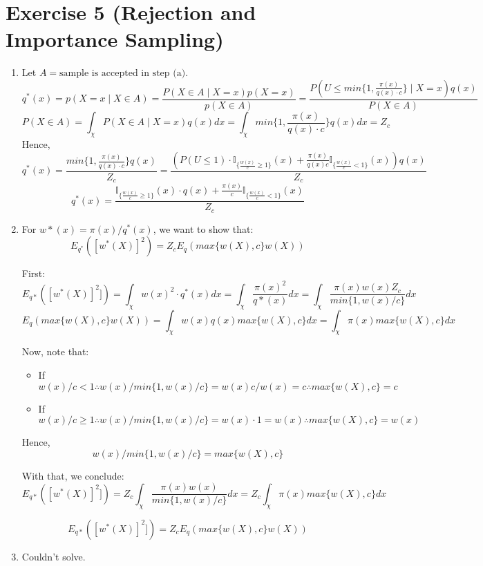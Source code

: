 \documentclass[12pt,letterpaper]{article}
\begin{document}
\section*{Exercise 5 (Rejection and Importance Sampling)}
\begin{enumerate}[leftmargin=!,labelindent=5pt]

	\item Let $A = \text{sample is accepted in step (a)}$.
	$$ q^*(x) = p(X=x \mid X \in A) =
	\frac{P(X \in A \mid X=x) p(X=x)}{p(X \in A)} = 
	\frac{P(U \leq min\{1,\frac{\pi(x)}{q(x)\cdot c}\}\mid X=x)
	q(x)}{P(X \in A)}
	$$
	$$ P(X \in A) = \int_\chi P(X \in A \mid X=x) q(x) dx =
	\int_\chi min\{1,\frac{\pi(x)}{q(x)\cdot c}\}q(x) dx = Z_c
	$$
	Hence,
	$$q^*(x) = \frac{ min\{1,\frac{\pi(x)}{q(x)\cdot c}\}q(x)}{Z_c}=
	\frac{
	\left(
	P(U \leq 1) \cdot \mathbb{I}_{\{ \frac{w(x)}{c}\geq 1\}}(x) + 
	\frac{\pi(x)}{q(x)c}
	\mathbb{I}_{\{ \frac{w(x)}{c} < 1\}}(x) \right)q(x)}{Z_c}
	$$
	$$ q^*(x) =
	\frac{
	\mathbb{I}_{\{ \frac{w(x)}{c}\geq 1\}}(x)\cdot q(x) + 
	\frac{\pi(x)}{c}
	\mathbb{I}_{\{ \frac{w(x)}{c} < 1\}}(x)}{Z_c}
	$$

	\item For $w*(x)=\pi(x)/q^*(x)$, we want to show that:
	$$ E_{q^*}([w^*(X)]^2) = Z_c E_q(max\{ w(X), c\}w(X))$$

	First:
	$$ E_{q*}([w^*(X)]^2]) = \int_\chi w(x)^2\cdot q^*(x) dx =
	\int_\chi \frac{\pi(x)^2}{q*(x)}dx = 
	\int_\chi \frac{\pi(x)w(x)Z_c}{min\{1,w(x)/c\}}dx
	$$
	$$E_q(max\{ w(X), c\}w(X)) = \int_\chi w(x)q(x)max\{ w(X), c\}dx=
	\int_\chi \pi(x)max\{ w(X), c\}dx$$

	Now, note that:
	\begin{itemize}
		\item If $w(x)/c < 1 \therefore w(x)/min\{1,w(x)/c\} =
		w(x)c/w(x)=c \therefore max\{ w(X), c\} = c $
		\item If $w(x)/c \geq 1 \therefore w(x)/min\{1,w(x)/c\} =
		w(x)\cdot 1=w(x) \therefore max\{ w(X), c\} = w(x) $
	\end{itemize}
	Hence,
	$$w(x)/min\{1,w(x)/c\} =max\{ w(X), c\} $$

	With that, we conclude:
	$$ E_{q*}([w^*(X)]^2]) =
	Z_c\int_\chi \frac{\pi(x)w(x)}{min\{1,w(x)/c\}}dx = 
	Z_c\int_\chi \pi(x)max\{ w(X), c\}dx	$$

	$$ E_{q*}([w^*(X)]^2]) = Z_cE_q(max\{ w(X), c\}w(X)) $$

	\item Couldn't solve.


\end{enumerate}
\end{document}
